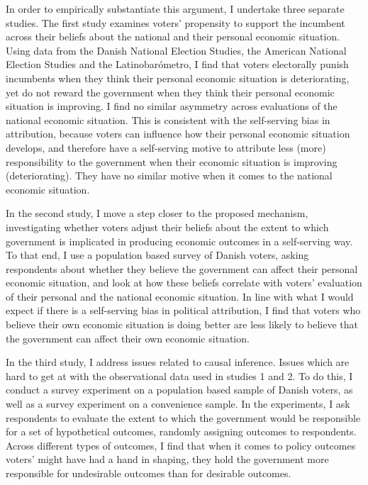 \documentclass[a4paper,11pt]{article}
\begin{document}
	
	In order to empirically substantiate this argument, I undertake three separate studies. The first study examines voters' propensity to support the incumbent across their beliefs about the national and their personal economic situation. Using data from the Danish National Election Studies, the American National Election Studies and the Latinobarómetro, I find that voters electorally punish incumbents when they think their personal economic situation is deteriorating, yet do not reward the government when they think their personal economic situation is improving. I find no similar asymmetry across evaluations of the national economic situation. This is consistent with the self-serving bias in attribution, because voters can influence how their personal economic situation develops, and therefore have a self-serving motive to attribute less (more) responsibility to the government when their economic situation is improving (deteriorating). They have no similar motive when it comes to the national economic situation. 
	
	In the second study, I move a step closer to the proposed mechanism, investigating whether voters adjust their beliefs about the extent to which government is implicated in producing economic outcomes in a self-serving way. To that end, I use a population based survey of Danish voters, asking  respondents about whether they believe the government can affect their personal economic situation, and look at how these beliefs correlate with voters' evaluation of their personal and the national economic situation. In line with what I would expect if there is a self-serving bias in political attribution, I find that voters who believe their own economic situation is doing better are less likely to believe that the government can affect their own economic situation. 
	
	In the third study, I address issues related to causal inference. Issues which are hard to get at with the observational data used in studies 1 and 2. To do this, I conduct a survey experiment on a population based sample of Danish voters, as well as a survey experiment on a convenience sample. In the experiments, I ask respondents to evaluate the extent to which the government would be responsible for a set of hypothetical outcomes, randomly assigning outcomes to respondents. Across different types of outcomes, I find that when it comes to policy outcomes voters' might have had a hand in shaping, they hold the government more responsible for undesirable outcomes than for desirable outcomes.
	
\end{document}
